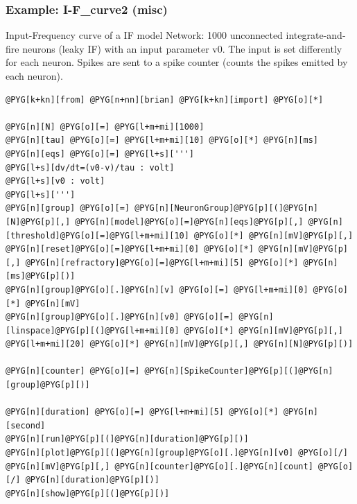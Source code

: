 \documentclass[letterpaper,10pt,english]{manual}
\begin{document}
\resetcurrentobjects
\hypertarget{--doc-examples-misc_I-F_curve2}{}

\hypertarget{index-40}{}\subsubsection{Example: I-F\_curve2 (misc)}

Input-Frequency curve of a IF model
Network: 1000 unconnected integrate-and-fire neurons (leaky IF)
with an input parameter v0.
The input is set differently for each neuron.
Spikes are sent to a spike counter (counts the spikes emitted by each neuron).

\begin{Verbatim}[commandchars=@\[\]]
@PYG[k+kn][from] @PYG[n+nn][brian] @PYG[k+kn][import] @PYG[o][*]

@PYG[n][N] @PYG[o][=] @PYG[l+m+mi][1000]
@PYG[n][tau] @PYG[o][=] @PYG[l+m+mi][10] @PYG[o][*] @PYG[n][ms]
@PYG[n][eqs] @PYG[o][=] @PYG[l+s][''']
@PYG[l+s][dv/dt=(v0-v)/tau : volt]
@PYG[l+s][v0 : volt]
@PYG[l+s][''']
@PYG[n][group] @PYG[o][=] @PYG[n][NeuronGroup]@PYG[p][(]@PYG[n][N]@PYG[p][,] @PYG[n][model]@PYG[o][=]@PYG[n][eqs]@PYG[p][,] @PYG[n][threshold]@PYG[o][=]@PYG[l+m+mi][10] @PYG[o][*] @PYG[n][mV]@PYG[p][,] @PYG[n][reset]@PYG[o][=]@PYG[l+m+mi][0] @PYG[o][*] @PYG[n][mV]@PYG[p][,] @PYG[n][refractory]@PYG[o][=]@PYG[l+m+mi][5] @PYG[o][*] @PYG[n][ms]@PYG[p][)]
@PYG[n][group]@PYG[o][.]@PYG[n][v] @PYG[o][=] @PYG[l+m+mi][0] @PYG[o][*] @PYG[n][mV]
@PYG[n][group]@PYG[o][.]@PYG[n][v0] @PYG[o][=] @PYG[n][linspace]@PYG[p][(]@PYG[l+m+mi][0] @PYG[o][*] @PYG[n][mV]@PYG[p][,] @PYG[l+m+mi][20] @PYG[o][*] @PYG[n][mV]@PYG[p][,] @PYG[n][N]@PYG[p][)]

@PYG[n][counter] @PYG[o][=] @PYG[n][SpikeCounter]@PYG[p][(]@PYG[n][group]@PYG[p][)]

@PYG[n][duration] @PYG[o][=] @PYG[l+m+mi][5] @PYG[o][*] @PYG[n][second]
@PYG[n][run]@PYG[p][(]@PYG[n][duration]@PYG[p][)]
@PYG[n][plot]@PYG[p][(]@PYG[n][group]@PYG[o][.]@PYG[n][v0] @PYG[o][/] @PYG[n][mV]@PYG[p][,] @PYG[n][counter]@PYG[o][.]@PYG[n][count] @PYG[o][/] @PYG[n][duration]@PYG[p][)]
@PYG[n][show]@PYG[p][(]@PYG[p][)]
\end{Verbatim}

\resetcurrentobjects
\hypertarget{--doc-examples-misc_if}{}
\end{document}
